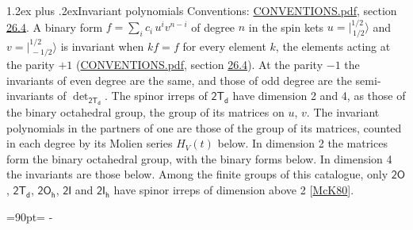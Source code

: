 \documentclass[10pt,a4paper]{article}
\makeatletter
\renewcommand\section{\@startsection{section}{1}{\z@}{-3ex plus -1ex minus -.2ex}%
  {1.2ex plus .2ex}{\normalfont\large\sffamily\bfseries\color{parttitle}}}
\newcommand{\needspace}[1]{\par\penalty-100\begingroup\dimen0=#1\relax\dimen2=\pagegoal
  \advance\dimen2-\pagetotal\ifdim\dimen0>\dimen2\relax\ifdim\dimen2>0pt\vfil\break\fi\fi
  \endgroup}
\numberwithin{equation}{section}
\newcommand{\grp}[1]{\mathsf{#1}}
\newcommand{\jm}[2]{\bigl\lvert{}^{#1}_{\,#2}\bigr\rangle}
\makeatother
\begin{document}
\section{Invariant polynomials}\label{s:invariants}
Conventions: \href{../../CONVENTIONS.pdf}{CONVENTIONS.pdf}, section \href{../../CONVENTIONS.pdf\#conv.26.4}{26.4}.
\leavevmode\label{n:local.binary.form}A binary form $f = \sum_i c_i\, u^i v^{n-i}$ of degree $n$ in the spin kets $u = \jm{1/2}{1/2}$ and $v = \jm{1/2}{-1/2}$ is invariant when $k f = f$ for every element $k$, the elements acting at the parity $+1$ (\href{../../CONVENTIONS.pdf}{CONVENTIONS.pdf}, section \href{../../CONVENTIONS.pdf\#conv.26.4}{26.4}). At the parity $-1$ the invariants of even degree are the same, and those of odd degree are the semi-invariants of $\det_{\grp{2T_{d}}}$.
The spinor irreps of $\grp{2T_{d}}$ have dimension 2 and 4, as those of the binary octahedral group, the group of its matrices on $u$, $v$. \label{n:function.hilbert}The invariant polynomials in the partners of one are those of the group of its matrices, counted in each degree by its Molien series $H_V(t)$ below. In dimension 2 the matrices form the binary octahedral group, with the binary forms below. In dimension 4 the invariants are those below. Among the finite groups of this catalogue, only $\grp{2O}$, $\grp{2T_{d}}$, $\grp{2O_{h}}$, $\grp{2I}$ and $\grp{2I_{h}}$ have spinor irreps of dimension above 2 [\href{../../../REFERENCES.pdf\#ref.McK80}{McK80}].
\needspace{90pt}
\end{document}

